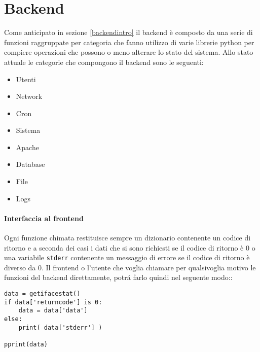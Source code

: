 \documentclass[11pt]{article}
\begin{document}
\section{Backend}\label{backend}
Come anticipato in sezione \ref{backendintro} il backend è composto da una serie di funzioni raggruppate per categoria
che fanno utilizzo di varie librerie python per compiere operazioni che possono o meno alterare lo stato del sistema.
Allo stato attuale le categorie che compongono il backend sono le seguenti:
\begin{itemize}
	\item{Utenti}
	\item{Network}
	\item{Cron}
	\item{Sistema}
	\item{Apache}
	\item{Database}
	\item{File}
	\item{Logs}
\end{itemize}

\paragraph{Interfaccia al frontend}\label{frontendinterface}
Ogni funzione chimata restituisce sempre un dizionario contenente un codice di ritorno e a seconda dei casi
i dati che si sono richiesti se il codice di ritorno è 0 o una variabile \texttt{stderr} contenente un messaggio di errore
se il codice di ritorno è diverso da 0.
Il frontend o l'utente che voglia chiamare per qualsivoglia motivo le funzioni del backend direttamente, potr\'a farlo quindi nel seguente modo::
\begin{lstlisting}
data = getifacestat()
if data['returncode'] is 0:
	data = data['data']
else:
	print( data['stderr'] )
 
pprint(data)
\end{lstlisting}
\end{document}
